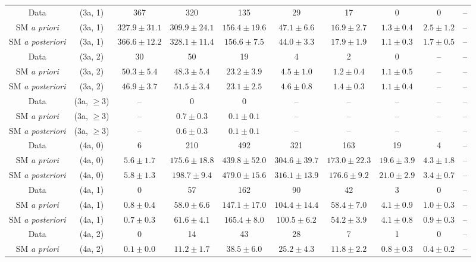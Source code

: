 \begin{table}[h!]
{\begin{tabular}{cccccccccc}
	Data & (3a, 1) & 367 & 320 & 135 & 29 & 17 & 0 & 0 & -- \\[0.5ex] 
	SM \textit{a priori} & (3a, 1) & $327.9\pm 31.1$ & $309.9\pm 24.1$ & $156.4\pm 19.6$ & $47.1\pm 6.6$ & $16.9\pm 2.7$ & $1.3\pm 0.4$ & $2.5\pm 1.2$ & -- \\[0.5ex] 
	SM \textit{a posteriori} & (3a, 1) & $366.6\pm 12.2$ & $328.1\pm 11.4$ & $156.6\pm 7.5$ & $44.0\pm 3.3$ & $17.9\pm 1.9$ & $1.1\pm 0.3$ & $1.7\pm 0.5$ & -- \\[0.5ex] 
	Data & (3a, 2) & 30 & 50 & 19 & 4 & 2 & 0 & -- & -- \\[0.5ex] 
	SM \textit{a priori} & (3a, 2) & $50.3\pm 5.4$ & $48.3\pm 5.4$ & $23.2\pm 3.9$ & $4.5\pm 1.0$ & $1.2\pm 0.4$ & $1.1\pm 0.5$ & -- & -- \\[0.5ex] 
	SM \textit{a posteriori} & (3a, 2) & $46.9\pm 3.7$ & $51.5\pm 3.4$ & $23.1\pm 2.5$ & $4.6\pm 0.8$ & $1.4\pm 0.3$ & $1.1\pm 0.4$ & -- & -- \\[0.5ex] 
	Data & (3a, $\ge3$) & -- & 0 & 0 & -- & -- & -- & -- & -- \\[0.5ex] 
	SM \textit{a priori} & (3a, $\ge3$) & -- & $0.7\pm 0.3$ & $0.1\pm 0.1$ & -- & -- & -- & -- & -- \\[0.5ex] 
	SM \textit{a posteriori} & (3a, $\ge3$) & -- & $0.6\pm 0.3$ & $0.1\pm 0.1$ & -- & -- & -- & -- & -- \\[0.5ex] 
	Data & (4a, 0) & 6 & 210 & 492 & 321 & 163 & 19 & 4 & -- \\[0.5ex] 
	SM \textit{a priori} & (4a, 0) & $5.6\pm 1.7$ & $175.6\pm 18.8$ & $439.8\pm 52.0$ & $304.6\pm 39.7$ & $173.0\pm 22.3$ & $19.6\pm 3.9$ & $4.3\pm 1.8$ & -- \\[0.5ex] 
	SM \textit{a posteriori} & (4a, 0) & $5.8\pm 1.3$ & $198.7\pm 9.4$ & $479.0\pm 15.6$ & $316.1\pm 13.9$ & $176.6\pm 9.2$ & $21.0\pm 2.9$ & $3.4\pm 0.7$ & -- \\[0.5ex] 
	Data & (4a, 1) & 0 & 57 & 162 & 90 & 42 & 3 & 0 & -- \\[0.5ex] 
	SM \textit{a priori} & (4a, 1) & $0.8\pm 0.4$ & $58.0\pm 6.6$ & $147.1\pm 17.0$ & $104.4\pm 14.4$ & $58.4\pm 7.0$ & $4.1\pm 0.9$ & $1.0\pm 0.3$ & -- \\[0.5ex] 
	SM \textit{a posteriori} & (4a, 1) & $0.7\pm 0.3$ & $61.6\pm 4.1$ & $165.4\pm 8.0$ & $100.5\pm 6.2$ & $54.2\pm 3.9$ & $4.1\pm 0.8$ & $0.9\pm 0.3$ & -- \\[0.5ex] 
	Data & (4a, 2) & 0 & 14 & 43 & 28 & 7 & 1 & 0 & -- \\[0.5ex] 
	SM \textit{a priori} & (4a, 2) & $0.1\pm 0.0$ & $11.2\pm 1.7$ & $38.5\pm 6.0$ & $25.2\pm 4.3$ & $11.8\pm 2.2$ & $0.8\pm 0.3$ & $0.4\pm 0.2$ & -- \\[0.5ex] 

\end{tabular}}
\end{table}
